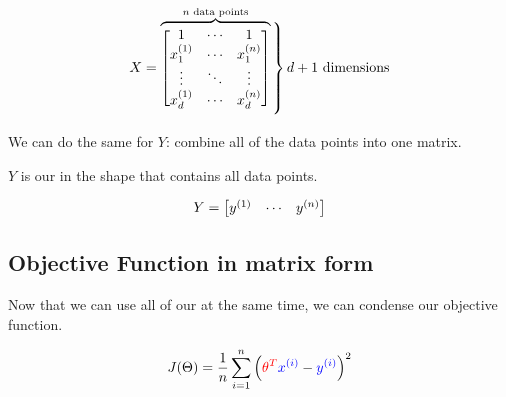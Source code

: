         \begin{equation}
            X = 
                \overbrace{
                    \begin{bmatrix}
                        1           & \cdots & 1           \\
                        \ex{x_1}{1} & \cdots  & \ex{x_1}{n} \\
                        \vdots      & \ddots & \vdots      \\
                        \ex{x_d}{1} & \cdots  & \ex{x_d}{n}
                    \end{bmatrix}
                    }^{ n \text{ data points}}
                \bigggrB{70pt} d+1 \text{ dimensions}
        \end{equation}
        
        We can do the same for $Y$: combine all of the data points into one matrix.\\
        
        \begin{kequation}
            $Y$ is our  in the shape  that contains all data points.
            
            \begin{equation*}
                Y = 
                    \begin{bmatrix}
                        y^{(1)} & \cdots & y^{(n)}
                    \end{bmatrix}
            \end{equation*}
        \end{kequation}


    \pagebreak

    \subsection{Objective Function in matrix form}

        Now that we can use all of our  at the same time, we can condense our objective function.

        \begin{equation}
            J(\Theta) = 
            \frac{1}{n}  \sum_{i=1}^n 
            \Big( \textcolor{red}{\theta^T} \textcolor{blue}{x^{(i)}}  - \textcolor{blue}{y^{(i)}}   \Big)^2
        \end{equation}

